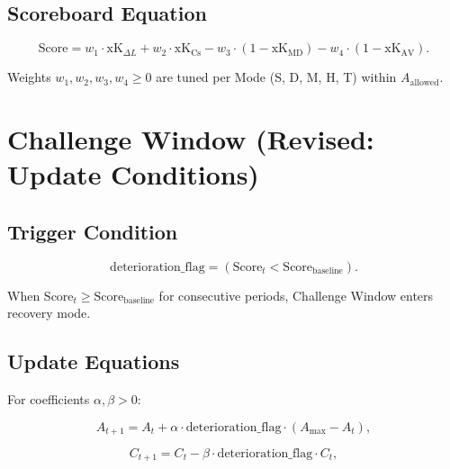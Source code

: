 \subsection{Scoreboard Equation}

\begin{equation}
\mathrm{Score} =
w_1 \cdot \mathrm{xK}_{\Delta L}
+ w_2 \cdot \mathrm{xK}_{\mathrm{Cs}}
- w_3 \cdot (1 - \mathrm{xK}_{\mathrm{MD}})
- w_4 \cdot (1 - \mathrm{xK}_{\mathrm{AV}}).
\label{eq:r1fix-scoreboard}
\end{equation}

\noindent
Weights $w_1, w_2, w_3, w_4 \ge 0$ are tuned per Mode (S, D, M, H, T)
within $A_{\mathrm{allowed}}$.

\section{Challenge Window (Revised: Update Conditions)}
\label{sec:r1fix-challenge-window}


\subsection{Trigger Condition}

\begin{equation}
\mathrm{deterioration\_flag} = (\mathrm{Score}_t <
\mathrm{Score}_{\mathrm{baseline}}).
\end{equation}

When $\mathrm{Score}_t \ge \mathrm{Score}_{\mathrm{baseline}}$ for
consecutive periods, Challenge Window enters recovery mode.

\subsection{Update Equations}

For coefficients $\alpha, \beta > 0$:

\begin{equation}
A_{t+1} = A_t + \alpha \cdot \mathrm{deterioration\_flag} \cdot
(A_{\max} - A_t),
\label{eq:r1fix-At-update}
\end{equation}

\begin{equation}
C_{t+1} = C_t - \beta \cdot \mathrm{deterioration\_flag} \cdot
C_t,
\label{eq:r1fix-Ct-update}
\end{equation}

